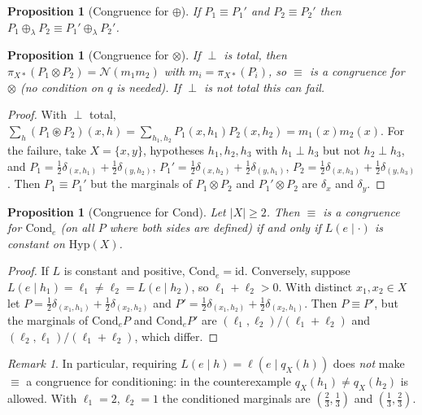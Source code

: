 \documentclass[11pt]{article}
\newtheorem{proposition}[theorem]{Proposition}
\theoremstyle{definition}
\theoremstyle{remark}
\newtheorem{remark}[theorem]{Remark}
\newcommand{\Hyp}{\mathrm{Hyp}}
\newcommand{\Cond}{\mathrm{Cond}}
\newcommand{\id}{\mathrm{id}}
\newcommand{\N}{\mathcal{N}}
\newcommand{\cp}{\circledast}
\begin{document}
\begin{proposition}[Congruence for $\oplus$]
If $P_1\equiv P_1'$ and $P_2\equiv P_2'$ then $P_1\oplus_\lambda P_2\equiv P_1'\oplus_\lambda P_2'$.
\end{proposition}

\begin{proposition}[Congruence for $\otimes$]\label{prop:cong-tensor}
If $\perp$ is total, then $\pi_{X*}(P_1\otimes P_2)=\N(m_1m_2)$ with $m_i=\pi_{X*}(P_i)$, so $\equiv$
is a congruence for $\otimes$ (no condition on $q$ is needed). If $\perp$ is not total this can fail.
\end{proposition}
\begin{proof}
With $\perp$ total, $\sum_h(P_1\cp P_2)(x,h)=\sum_{h_1,h_2}P_1(x,h_1)P_2(x,h_2)=m_1(x)m_2(x)$.
For the failure, take $X=\{x,y\}$, hypotheses $h_1,h_2,h_3$ with $h_1\perp h_3$ but not
$h_2\perp h_3$, and
$P_1=\tfrac12\delta_{(x,h_1)}+\tfrac12\delta_{(y,h_2)}$,
$P_1'=\tfrac12\delta_{(x,h_2)}+\tfrac12\delta_{(y,h_1)}$,
$P_2=\tfrac12\delta_{(x,h_3)}+\tfrac12\delta_{(y,h_3)}$. Then $P_1\equiv P_1'$ but the marginals of
$P_1\otimes P_2$ and $P_1'\otimes P_2$ are $\delta_x$ and $\delta_y$.
\end{proof}

\begin{proposition}[Congruence for $\Cond$]\label{prop:cong-cond}
Let $|X|\ge2$. Then $\equiv$ is a congruence for $\Cond_e$ (on all $P$ where both sides are defined)
if and only if $L(e\mid\cdot)$ is constant on $\Hyp(X)$.
\end{proposition}
\begin{proof}
If $L$ is constant and positive, $\Cond_e=\id$. Conversely, suppose $L(e\mid h_1)=\ell_1\ne
\ell_2=L(e\mid h_2)$, so $\ell_1+\ell_2>0$. With distinct $x_1,x_2\in X$ let
$P=\tfrac12\delta_{(x_1,h_1)}+\tfrac12\delta_{(x_2,h_2)}$ and
$P'=\tfrac12\delta_{(x_1,h_2)}+\tfrac12\delta_{(x_2,h_1)}$. Then $P\equiv P'$, but the marginals of
$\Cond_eP$ and $\Cond_eP'$ are $(\ell_1,\ell_2)/(\ell_1+\ell_2)$ and $(\ell_2,\ell_1)/(\ell_1+\ell_2)$,
which differ.
\end{proof}

\begin{remark}
In particular, requiring $L(e\mid h)=\ell(e\mid q_X(h))$ does \emph{not} make $\equiv$ a congruence for
conditioning: in the counterexample $q_X(h_1)\ne q_X(h_2)$ is allowed. With $\ell_1=2,\ell_2=1$ the
conditioned marginals are $(\tfrac23,\tfrac13)$ and $(\tfrac13,\tfrac23)$.
\end{remark}
\end{document}
